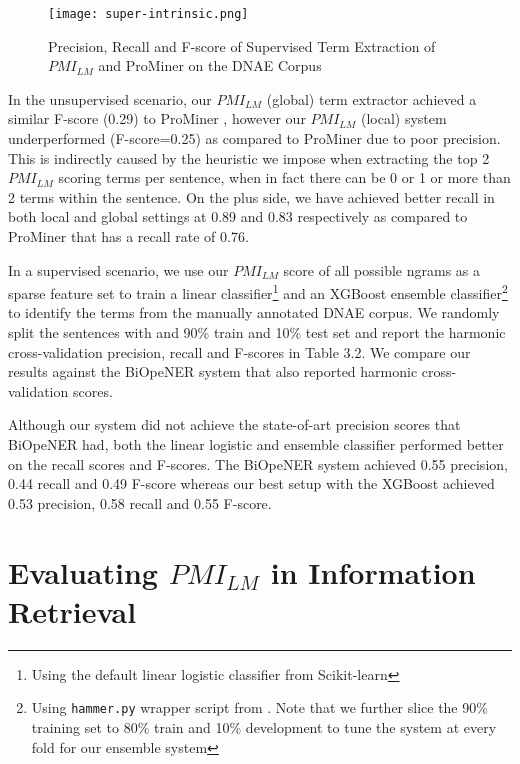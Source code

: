 \begin{figure}[!htb]
\centering
	\hspace{-2em}%
	\texttt{[image: super-intrinsic.png]} \\[-1em]
	\caption{Precision, Recall and F-score of Supervised Term Extraction of $PMI_{LM}$ and ProMiner on the DNAE Corpus}
	\label{fig-unsuper-intrinsic}
\end{figure}


In the unsupervised scenario, our $PMI_{LM}$ (global) term extractor achieved a similar F-score (0.29) to ProMiner , however our $PMI_{LM}$ (local) system underperformed (F-score=0.25) as compared to ProMiner due to poor precision. This is indirectly caused by the heuristic we impose when extracting the top 2 $PMI_{LM}$ scoring terms per sentence, when in fact there can be 0 or 1 or more than 2 terms within the sentence. 
On the plus side, we have achieved better recall in both local and global settings at 0.89 and 0.83 respectively as compared to ProMiner that has a recall rate of 0.76.

In a supervised scenario, we use our $PMI_{LM}$ score of all possible ngrams as a sparse feature set to train a linear classifier\footnote{Using the default linear logistic classifier from Scikit-learn\citep{Pedregosa2011}} and an XGBoost ensemble classifier\footnote{Using {\tt hammer.py} wrapper script from \citep{bechara-EtAl:2016:SemEval}. Note that we further slice the 90\% training set to 80\% train and 10\% development to tune the system at every fold for our ensemble system} \citep{chenxgboost} to identify the terms from the manually annotated DNAE corpus. We randomly split the sentences with and 90\% train and 10\% test set and report the harmonic cross-validation precision, recall and F-scores in Table 3.2. We compare our results against the BiOpeNER \citep{biopener} system that also reported harmonic cross-validation scores. 

Although our system did not achieve the state-of-art precision scores that BiOpeNER had, both the linear logistic and ensemble classifier performed better on the recall scores and F-scores. The BiOpeNER system achieved 0.55 precision, 0.44 recall and 0.49 F-score whereas our best setup with the XGBoost achieved 0.53 precision, 0.58 recall and 0.55 F-score.

\section{Evaluating $PMI_{LM}$ in Information Retrieval}

